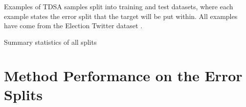 \afterpage{%
    \thispagestyle{document}
    \begin{landscape}%
            \centering
            
    \end{landscape}
    \clearpage%
}

\begin{table}[!ht]
    \centering
    
    \caption{Examples of TDSA samples split into training and test datasets, where each example states the error split that the target will be put within. All examples have come from the Election Twitter dataset \citep{aug_wang_2017}.}
    \label{table:aug_error_split_examples}
\end{table}

\begin{table}[!ht]
    \centering
    
    \caption{Summary statistics of all splits}
    \label{table:aug_error_analysis_summary_stats}
\end{table}

\section{Method Performance on the Error Splits}

